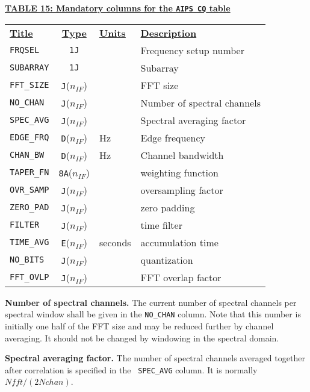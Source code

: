 \documentclass[twoside]{article}
\newcommand{\nif}{$n_{IF}$}
\begin{document}
\vfill\eject
\begin{center}
\underline{\bf{TABLE 15: Mandatory columns for the {\tt AIPS CQ} table}}\\
\begin{tabular}{lcll}
\noalign{\vspace{2pt}} \label{ta:CQcols}
\underline{{\bf Title\vphantom{y}}} & \underline{\bf{Type}} &
   \underline{{\bf Units\vphantom{y}}} & \underline{\bf{Description}} \\
\noalign{\vspace{2pt}}
{\tt FRQSEL}      & {\tt 1J}      &  & Frequency setup number \\
{\tt SUBARRAY}    & {\tt 1J}      &  & Subarray \\
{\tt FFT\_SIZE}   & {\tt J}(\nif) &  & FFT size \\
{\tt NO\_CHAN}    & {\tt J}(\nif) &  & Number of spectral channels \\
{\tt SPEC\_AVG}   & {\tt J}(\nif) &  & Spectral averaging factor \\
{\tt EDGE\_FRQ}   & {\tt D}(\nif) & Hz & Edge frequency \\
{\tt CHAN\_BW}    & {\tt D}(\nif) & Hz & Channel bandwidth \\
{\tt TAPER\_FN}   & {\tt 8A}(\nif) &  & weighting function \\
{\tt OVR\_SAMP}   & {\tt J}(\nif) &  & oversampling factor \\
{\tt ZERO\_PAD}   & {\tt J}(\nif) &  & zero padding \\
{\tt FILTER}      & {\tt J}(\nif) &  & time filter \\
{\tt TIME\_AVG}   & {\tt E}(\nif) & seconds & accumulation time \\
{\tt NO\_BITS}    & {\tt J}(\nif) &  & quantization \\
{\tt FFT\_OVLP}   & {\tt J}(\nif) &  & FFT overlap factor
\end{tabular}
\end{center}

{\bf Number of spectral channels.}  The current number of spectral
channels per spectral window shall be given in the {\tt NO\_CHAN}
column.  Note that this number is initially one half of the FFT size
and may be reduced further by channel averaging.  It should not be
changed by windowing in the spectral domain.

{\bf Spectral averaging factor.}  The number of spectral channels
averaged together after correlation is specified in the {\tt
  SPEC\_AVG} column.  It is normally $Nfft / (2 Nchan)$.
\end{document}
